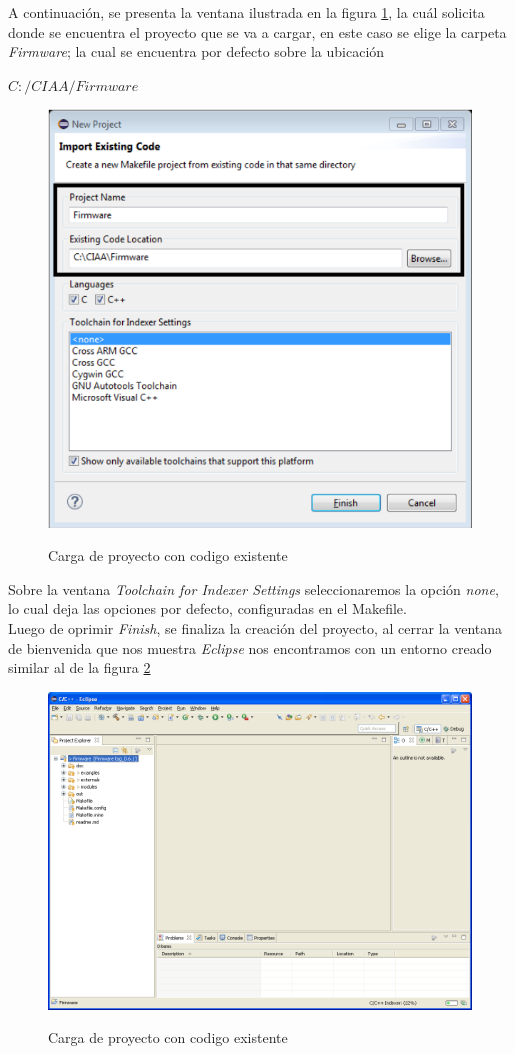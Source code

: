 \documentclass[12pt,letterpaper]{article}
\begin{document}
A continuación, se presenta la ventana ilustrada en la figura \ref{primer_proy2}, la cuál solicita donde se encuentra el proyecto que se va a cargar, en este caso se elige la carpeta \textit{Firmware}; la cual se encuentra por defecto sobre la ubicación \begin{center}
\emph{$C:/CIAA/Firmware$}
\end{center}
\begin{center}
\begin{figure}[!h]
\centering
\includegraphics[width=8 cm]{figuras/primer_proy2.png}\\
\caption{Carga de proyecto con codigo existente}
\label{primer_proy2}
\end{figure}
\end{center}
Sobre la ventana \textit{Toolchain for Indexer Settings} seleccionaremos la opción \textit{none}, lo cual deja las opciones por defecto, configuradas en el Makefile.\\
Luego de oprimir \textit{Finish}, se finaliza la creación del proyecto, al cerrar la ventana de bienvenida que nos muestra \textit{Eclipse} nos encontramos con un entorno creado similar al de la figura \ref{primer_proy3}
\begin{center}
\begin{figure}[!h]
\centering
\includegraphics[width=13 cm]{figuras/primer_proy3.png}\\
\caption{Carga de proyecto con codigo existente}
\label{primer_proy3}
\end{figure}
\end{center}
\end{document}
